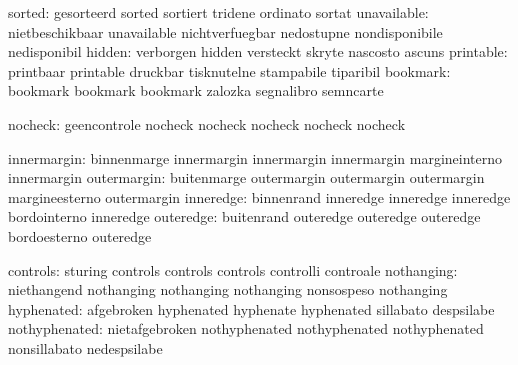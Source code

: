                    sorted: gesorteerd                sorted
                           sortiert                  tridene
                           ordinato                  sortat
              unavailable: nietbeschikbaar           unavailable
                           nichtverfuegbar           nedostupne
                           nondisponibile            nedisponibil
                   hidden: verborgen                 hidden
                           versteckt                 skryte
                           nascosto                  ascuns
                printable: printbaar                 printable
                           druckbar                  tisknutelne
                           stampabile                tiparibil
                 bookmark: bookmark                  bookmark
                           bookmark                  zalozka
                           segnalibro                semncarte

     nocheck: geencontrole  nocheck
              nocheck       nocheck
              nocheck       nocheck


              innermargin: binnenmarge               innermargin
                           innermargin               innermargin
                           margineinterno            innermargin
              outermargin: buitenmarge               outermargin
                           outermargin               outermargin
                           margineesterno            outermargin
                inneredge: binnenrand                inneredge
                           inneredge                 inneredge
                           bordointerno              inneredge
                outeredge: buitenrand                outeredge
                           outeredge                 outeredge
                           bordoesterno              outeredge

                 controls: sturing                   controls
                           controls                  controls
                           controlli                 controale
               nothanging: niethangend               nothanging
                           nothanging                nothanging
                           nonsospeso                nothanging
               hyphenated: afgebroken                hyphenated
                           hyphenate                 hyphenated
                           sillabato                 despsilabe
            nothyphenated: nietafgebroken            nothyphenated
                           nothyphenated             nothyphenated
                           nonsillabato              nedespsilabe

